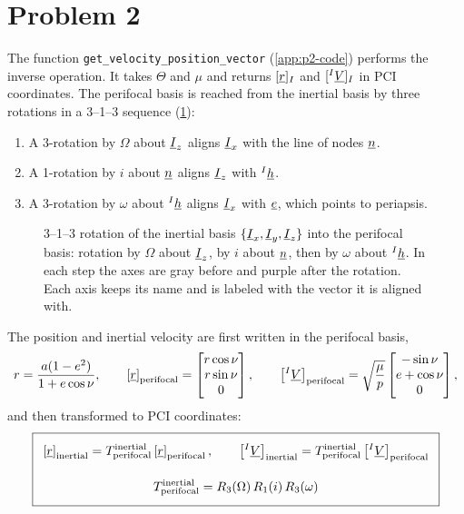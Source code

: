 \section{Problem 2}
\label{sec:problem2}

The function \texttt{get\_velocity\_position\_vector} (\cref{app:p2-code}) performs the inverse operation. It takes $\Theta$ and $\mu$ and returns $[\underline{r}]_I$ and $[{}^{I}\underline{V}]_I$ in PCI coordinates. The perifocal basis is reached from the inertial basis by three rotations in a 3--1--3 sequence (\cref{fig:p2}):
\begin{enumerate}
    \item A 3-rotation by $\Omega$ about $\underline{I}_z$ aligns $\underline{I}_x$ with the line of nodes $\underline{n}$.
    \item A 1-rotation by $i$ about $\underline{n}$ aligns $\underline{I}_z$ with ${}^{I}\underline{h}$.
    \item A 3-rotation by $\omega$ about ${}^{I}\underline{h}$ aligns $\underline{I}_x$ with $\underline{e}$, which points to periapsis.
\end{enumerate}

\begin{figure}[H]
\centering

\caption{3--1--3 rotation of the inertial basis $\{\underline{I}_x,\underline{I}_y,\underline{I}_z\}$ into the perifocal basis: rotation by $\Omega$ about $\underline{I}_z$, by $i$ about $\underline{n}$, then by $\omega$ about ${}^{I}\underline{h}$. In each step the axes are gray before and purple after the rotation. Each axis keeps its name and is labeled with the vector it is aligned with.}
\label{fig:p2}
\end{figure}

The position and inertial velocity are first written in the perifocal basis,
\begin{equation}
r = \frac{a(1-e^2)}{1+e\cos\nu}, \qquad
\left[\underline{r}\right]_{\text{perifocal}} = \begin{bmatrix} r\cos\nu \\ r\sin\nu \\ 0 \end{bmatrix}, \qquad
\left[{}^{I}\underline{V}\right]_{\text{perifocal}} = \sqrt{\frac{\mu}{p}}\begin{bmatrix} -\sin\nu \\ e+\cos\nu \\ 0 \end{bmatrix},
\end{equation}
and then transformed to PCI coordinates:
\begin{equation}
\setlength{\fboxsep}{8pt}
\boxed{
\begin{gathered}
\left[\vect{r}\right]_{\text{inertial}} = T^{\text{inertial}}_{\text{perifocal}}\left[\vect{r}\right]_{\text{perifocal}}, \qquad
\left[\ivect{V}\right]_{\text{inertial}} = T^{\text{inertial}}_{\text{perifocal}}\left[\ivect{V}\right]_{\text{perifocal}} \\[10pt]
T^{\text{inertial}}_{\text{perifocal}} = R_3(\Omega)\,R_1(i)\,R_3(\omega)
\end{gathered}
}
\end{equation}

\FloatBarrier
